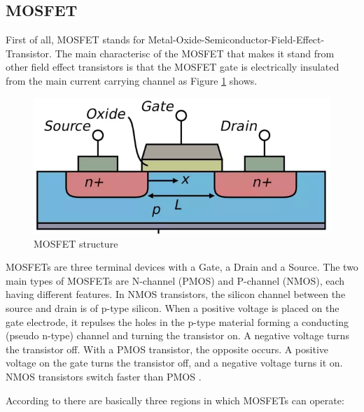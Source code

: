 \subsection{MOSFET}\label{ssec:mosfet}
	First of all, MOSFET stands for Metal-Oxide-Semiconductor-Field-Effect-Transistor. The main characterisc of the MOSFET that makes it stand from other field effect transistors is that the MOSFET gate is electrically insulated from the main current carrying channel as Figure \ref{fig:mosfet-structure} shows. 

		\begin{figure}[htbp]
			\centering
			\includegraphics[scale=0.5]{figuras/fig-mosfet-structure.png}
			\caption{MOSFET structure \cite{mosfet-structure}}
			\label{fig:mosfet-structure}
		\end{figure}

	MOSFETs are three terminal devices with a Gate, a Drain and a Source. The two main types of MOSFETs are N-channel (PMOS) and P-channel (NMOS), each having different features. In NMOS transistors, the silicon channel between the source and drain is of p-type silicon. When a positive voltage is placed on the gate electrode, it repulses the holes in the p-type material forming a conducting (pseudo n-type) channel and turning the transistor on. A negative voltage turns the transistor off. With a PMOS transistor, the opposite occurs. A positive voltage on the gate turns the transistor off, and a negative voltage turns it on. NMOS transistors switch faster than PMOS \cite{et-mosfet}. 
	\par
	According to \cite{radio-mosfet} there are basically three regions in which MOSFETs can operate:

